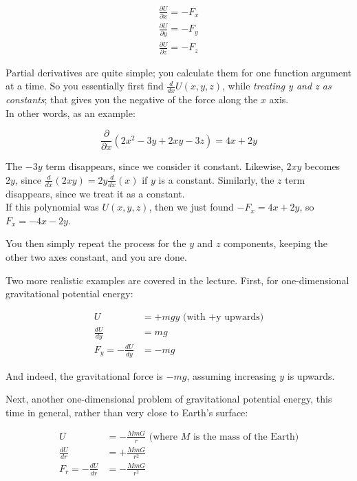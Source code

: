 \documentclass[12pt,a4paper]{report}
\begin{document}
\begin{align}
\frac{\partial U}{\partial x} = - F_x\\
\frac{\partial U}{\partial y} = - F_y\\
\frac{\partial U}{\partial z} = - F_z
\end{align}

Partial derivatives are quite simple; you calculate them for one function argument at a time. So you essentially first find $\displaystyle \frac{d}{dx} U(x,y,z)$, while \emph{treating y and z as constants}; that gives you the negative of the force along the $x$ axis.\\
In other words, as an example:

\begin{equation}
\frac{\partial}{\partial x}\left(2x^2 - 3y + 2 x y - 3z\right) = 4x + 2y
\end{equation}

The $-3 y$ term disappears, since we consider it constant. Likewise, $2 x y$ becomes $2 y$, since $\displaystyle \frac{d}{dx}(2 x y) = 2 y \frac{d}{dx} (x)$ if $y$ is a constant. Similarly, the $z$ term disappears, since we treat it as a constant.\\
If this polynomial was $U(x, y, z)$, then we just found $-F_x = 4x + 2 y$, so $F_x = -4 x - 2 y$.

You then simply repeat the process for the $y$ and $z$ components, keeping the other two axes constant, and you are done.

Two more realistic examples are covered in the lecture. First, for one-dimensional gravitational potential energy:

\begin{align}
U &= + m g y \text{ (with +y upwards)}\\
\frac{dU}{dy} &= m g\\
F_y = -\frac{dU}{dy} &= - mg
\end{align}

And indeed, the gravitational force is $- m g$, assuming increasing $y$ is upwards.

Next, another one-dimensional problem of gravitational potential energy, this time in general, rather than very close to Earth's surface:

\begin{align}
U &= -\frac{M m G}{r} \text{ (where $M$ is the mass of the Earth)}\\
\frac{dU}{dr} &= +\frac{M m G}{r^2}\\
F_r = -\frac{dU}{dr} &= -\frac{M m G}{r^2}
\end{align}
\end{document}
